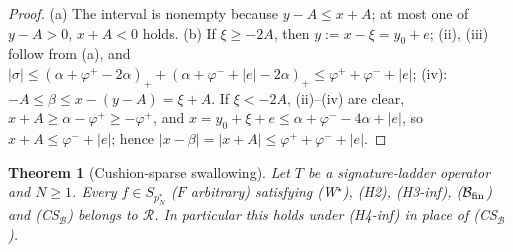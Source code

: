 \documentclass[10pt]{amsart}
\newtheorem{theorem}{Theorem}[section]
\theoremstyle{definition}
\theoremstyle{remark}
\newcommand{\Rec}{\mathcal R}
\begin{document}
\begin{proof}
(a) The interval is nonempty because $y-A\le x+A$; at most one of $y-A>0$,
$x+A<0$ holds.  (b) If $\xi\ge-2A$, then $y:=x-\xi=y_0+e$; (ii), (iii) follow
from (a), and $|\sigma|\le(\alpha+\varphi^+-2\alpha)_++(\alpha+\varphi^-+|e|-
2\alpha)_+\le\varphi^++\varphi^-+|e|$; (iv): $-A\le\beta\le x-(y-A)=\xi+A$.
If $\xi<-2A$, (ii)--(iv) are clear, $x+A\ge\alpha-\varphi^+\ge-\varphi^+$, and
$x=y_0+\xi+e\le\alpha+\varphi^--4\alpha+|e|$, so $x+A\le\varphi^-+|e|$; hence
$|x-\beta|=|x+A|\le\varphi^++\varphi^-+|e|$.
\end{proof}

\begin{theorem}[Cushion-sparse swallowing]\label{thm:II-R1}
Let $T$ be a signature-ladder operator and $N\ge1$.  Every $f\in S_{p_N^*}$
\textup{(}$F$ arbitrary\textup{)} satisfying \textup{(W$^\star$)},
\textup{(H2)}, \textup{(H3-inf)}, \textup{($\mathcal B_{\rm fin}$)} and
\textup{(CS$_{\mathcal B}$)} belongs to $\Rec$.  In particular this holds
under \textup{(H4-inf)} in place of \textup{(CS$_{\mathcal B}$)}.
\end{theorem}
\end{document}
